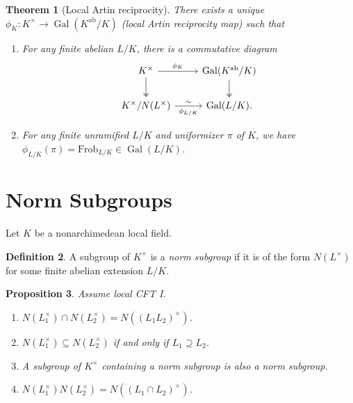 \documentclass[leqno, openany]{memoir}
\newtheorem{thm}{Theorem}[section]
\newtheorem{prop}[thm]{Proposition}
\theoremstyle{definition}
\newtheorem{defn}[thm]{Definition}
\theoremstyle{remark}
\theoremstyle{plain}
\theoremstyle{definition}
\theoremstyle{remark}
\newcommand{\mr}[1]{\mathrm{#1}}
\DeclareMathOperator{\Gal}{Gal}
\begin{document}
\begin{thm}[Local Artin reciprocity]
    There exists a unique $\phi_K \colon K^{\times} \to \Gal(K^{\mr{ab}}/K)$ (local Artin reciprocity map) such that
    \begin{enumerate}
        \item For any finite abelian $L/K$, there is a commutative diagram 
            \begin{equation*}
            \begin{tikzcd}
                K^{\times} \arrow{r}{\phi_K} \arrow[twoheadrightarrow]{d} & \Gal(K^{\mr{ab}}/K) \arrow[twoheadrightarrow]{d} \\
                K^{\times} / N(L^{\times}) \arrow{r}{\sim}[swap]{\phi_{L/K}} & \Gal(L/K).
            \end{tikzcd}
            \end{equation*}
        \item For any finite unramified $L/K$ and uniformizer $\pi$ of $K$, we have $\phi_{L/K}(\pi) = \mr{Frob}_{L/K} \in \Gal(L/K)$.
    \end{enumerate}
\end{thm}

\section{Norm Subgroups}%
\label{sec:norm_subgroups}

Let $K$ be a nonarchimedean local field.

\begin{defn}
    A subgroup of $K^{\times}$ is a \textit{norm subgroup} if it is of the form $N(L^{\times})$ for some finite abelian extension $L/K$.
\end{defn}

\begin{prop}
    Assume local CFT I. 
    \begin{enumerate}
        \item $N(L_1^{\times}) \cap N(L_2^{\times}) = N({(L_1 L_2)}^{\times})$.
        \item $N(L_1^{\times}) \subseteq N(L_2^{\times})$ if and only if $L_1 \supseteq L_2$.
        \item A subgroup of $K^{\times}$ containing a norm subgroup is also a norm subgroup.
        \item $N(L_1^{\times}) N(L_2^{\times}) = N({(L_1 \cap L_2)}^{\times})$.
    \end{enumerate}
\end{prop}
\end{document}
